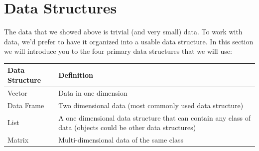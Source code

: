 \documentclass[]{book}
\begin{document}
\section{Data Structures}\label{data-structures}

The data that we showed above is trivial (and very small) data. To work
with data, we'd prefer to have it organized into a usable data
structure. In this section we will introduce you to the four primary
data structures that we will use:

\begin{longtable}[]{@{}ll@{}}
\toprule
\begin{minipage}[b]{0.18\columnwidth}\raggedright\strut
Data Structure\strut
\end{minipage} & \begin{minipage}[b]{0.24\columnwidth}\raggedright\strut
Definition\strut
\end{minipage}\tabularnewline
\midrule
\endhead
\begin{minipage}[t]{0.18\columnwidth}\raggedright\strut
Vector\strut
\end{minipage} & \begin{minipage}[t]{0.24\columnwidth}\raggedright\strut
Data in one dimension\strut
\end{minipage}\tabularnewline
\begin{minipage}[t]{0.18\columnwidth}\raggedright\strut
Data Frame\strut
\end{minipage} & \begin{minipage}[t]{0.24\columnwidth}\raggedright\strut
Two dimensional data (most commonly used data structure)\strut
\end{minipage}\tabularnewline
\begin{minipage}[t]{0.18\columnwidth}\raggedright\strut
List\strut
\end{minipage} & \begin{minipage}[t]{0.24\columnwidth}\raggedright\strut
A one dimensional data structure that can contain any class of data
(objects could be other data structures)\strut
\end{minipage}\tabularnewline
\begin{minipage}[t]{0.18\columnwidth}\raggedright\strut
Matrix\strut
\end{minipage} & \begin{minipage}[t]{0.24\columnwidth}\raggedright\strut
Multi-dimensional data of the same class\strut
\end{minipage}\tabularnewline
\bottomrule
\end{longtable}
\end{document}
